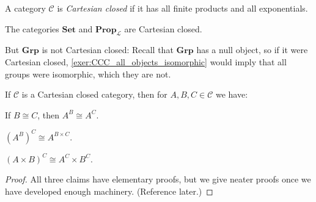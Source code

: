 \documentclass[article, a4paper, 11pt, oneside]{memoir}
\numberwithin{equation}{chapter}
\newcommand{\calL}{\mathcal{L}}
\newcommand{\cat}[1]{\mathcal{#1}}
\newcommand{\ncat}[1]{\mathbf{#1}} %
\newcommand{\catSet}{\ncat{Set}}
\newcommand{\catGrp}{\ncat{Grp}}
\newcommand{\catProp}{\ncat{Prop}}
\newcommand{\catC}{\cat{C}}
\begin{document}
\begin{definition}
    A category $\catC$ is \emph{Cartesian closed} if it has all finite products and all exponentials.
\end{definition}


\begin{examplebreak}
    \begin{enumexample}
        \item The categories $\catSet$ and $\catProp_\calL$ are Cartesian closed.

        \item But $\catGrp$ is not Cartesian closed: Recall that $\catGrp$ has a null object, so if it were Cartesian closed, \cref{exer:CCC_all_objects_isomorphic} would imply that all groups were isomorphic, which they are not.
    \end{enumexample}
\end{examplebreak}


\begin{theorem}
    If $\catC$ is a Cartesian closed category, then for $A,B,C \in \catC$ we have:
    \begin{enumthm}
        \item If $B \cong C$, then $A^B \cong A^C$.
        
        \item $(A^B)^C \cong A^{B \times C}$.
        
        \item $(A \times B)^C \cong A^C \times B^C$.
    \end{enumthm}
\end{theorem}

\begin{proof}
    All three claims have elementary proofs, but we give neater proofs once we have developed enough machinery. (Reference later.)
\end{proof}



\end{document}
